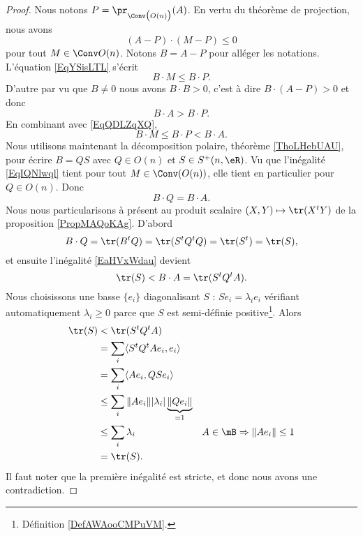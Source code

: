 \begin{proof}
    Nous notons \( P=\pr_{\Conv\big( O(n) \big)}(A)\). En vertu du théorème de projection, nous avons
    \begin{equation}    \label{EqYSisLTL}
        (A-P)\cdot (M-P)\leq 0
    \end{equation}
    pour tout \( M\in\Conv O(n)\). Notons \( B=A-P\) pour alléger les notations. L'équation \eqref{EqYSisLTL} s'écrit
    \begin{equation}    \label{EqQDLZqXQ}
        B\cdot M\leq B\cdot P.
    \end{equation}
    D'autre par vu que \( B \neq 0\) nous avons \( B\cdot B> 0\), c'est à dire \( B\cdot (A-P)>0\) et donc
    \begin{equation}
        B\cdot A>B\cdot P.
    \end{equation}
    En combinant avec \eqref{EqQDLZqXQ},
    \begin{equation}        \label{EqIQNlwql}
        B\cdot M\leq B\cdot P<B\cdot A.
    \end{equation}
    Nous utilisons maintenant la décomposition polaire, théorème \ref{ThoLHebUAU}, pour écrire \( B=QS\) avec \( Q\in O(n)\) et \( S\in S^+(n,\eR)\). Vu que l'inégalité \eqref{EqIQNlwql} tient pour tout \( M\in\Conv(O(n))\), elle tient en particulier pour \( Q\in O(n)\). Donc
    \begin{equation}
        B\cdot Q=B\cdot A.
    \end{equation}
    Nous nous particularisons à présent au produit scalaire \( (X,Y)\mapsto\tr(X^tY)\) de la proposition \ref{PropMAQoKAg}. D'abord
    \begin{equation}    \label{EaHVxWdau}
        B\cdot Q=\tr(B^tQ)=\tr(S^tQ^tQ)=\tr(S^t)=\tr(S),
    \end{equation}
    et ensuite l'inégalité \eqref{EaHVxWdau} devient
    \begin{equation}
        \tr(S)<B\cdot A=\tr(S^tQ^tA).
    \end{equation}
    Nous choisissons une basse \( \{ e_i \}\) diagonalisant \( S\) : \( Se_i=\lambda_ie_i\) vérifiant automatiquement \( \lambda_i\geq 0\) parce que \( S\) est semi-définie positive\footnote{Définition \ref{DefAWAooCMPuVM}.}. Alors
    \begin{subequations}
        \begin{align}
            \tr(S)&<\tr(S^tQ^tA)\\
            &=\sum_i\langle S^tQ^tAe_i, e_i\rangle \\
            &=\sum_i\langle Ae_i, QSe_i\rangle \\
            &\leq \sum_i \| Ae_i \| | \lambda_i | \underbrace{\| Qe_i \|}_{=1} \\
            &\leq \sum_i\lambda_i   & A\in\mB\Rightarrow\| Ae_i \|\leq 1\\
            &=\tr(S).
        \end{align}
    \end{subequations}
    Il faut noter que la première inégalité est stricte, et donc nous avons une contradiction.
\end{proof}

